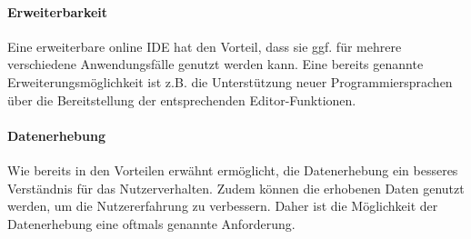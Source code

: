 \paragraph{Erweiterbarkeit}
Eine erweiterbare online IDE hat den Vorteil, dass sie ggf. für mehrere verschiedene Anwendungsfälle genutzt werden kann. Eine bereits genannte Erweiterungsmöglichkeit ist z.B. die Unterstützung neuer Programmiersprachen über die Bereitstellung der entsprechenden Editor-Funktionen.

\paragraph{Datenerhebung}
Wie bereits in den Vorteilen erwähnt ermöglicht, die Datenerhebung ein besseres Verständnis für das Nutzerverhalten. Zudem können die erhobenen Daten genutzt werden, um die Nutzererfahrung zu verbessern. Daher ist die Möglichkeit der Datenerhebung eine oftmals genannte Anforderung.
